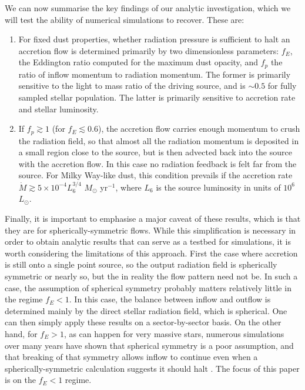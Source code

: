 \documentclass[useAMS,usenatbib]{mn2e}
\begin{document}
We can now summarise the key findings of our analytic investigation, which we will test the ability of numerical simulations to recover. These are:
\begin{enumerate}
\item For fixed dust properties, whether radiation pressure is sufficient to halt an accretion flow is determined primarily by two dimensionless parameters: $f_E$, the Eddington ratio computed for the maximum dust opacity, and $f_p$ the ratio of inflow momentum to radiation momentum. The former is primarily sensitive to the light to mass ratio of the driving source, and is $\sim 0.5$ for fully sampled stellar population. The latter is primarily sensitive to accretion rate and stellar luminosity.
\item If $f_p\gtrsim 1$ (for $f_E\lesssim 0.6$), the accretion flow carries enough momentum to crush the radiation field, so that almost all the radiation momentum is deposited in a small region close to the source, but is then advected back into the source with the accretion flow. In this case no radiation feedback is felt far from the source. For Milky Way-like dust, this condition prevails if the accretion rate $\dot{M} \gtrsim 5\times 10^{-4} L_6^{3/4}$ $M_\odot$ yr$^{-1}$, where $L_6$ is the source luminosity in units of $10^6$ $L_\odot$.
\end{enumerate}

Finally, it is important to emphasise a major caveat of these results, which is that they are for spherically-symmetric flows. While this simplification is necessary in order to obtain analytic results that can serve as a testbed for simulations, it is worth considering the limitations of this approach. First the case where accretion is still onto a single point source, so the output radiation field is spherically symmetric or nearly so, but the in reality the flow pattern need not be. In such a case, the assumption of spherical symmetry probably matters relatively little in the regime $f_E < 1$. In this case, the balance between inflow and outflow is determined mainly by the direct stellar radiation field, which is spherical. One can then simply apply these results on a sector-by-sector basis. On the other hand, for $f_E > 1$, as can happen for very massive stars, numerous simulations over many years have shown that spherical symmetry is a poor assumption, and that breaking of that symmetry allows inflow to continue even when a spherically-symmetric calculation suggests it should halt \citep[e.g.,][]{krumholz09c, kuiper11a, rosen16a}. The focus of this paper is on the $f_E < 1$ regime.
\end{document}
